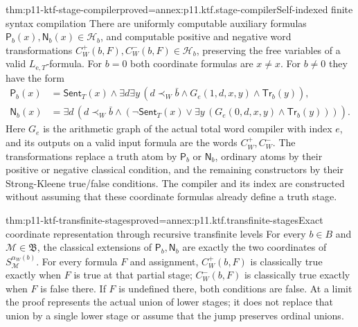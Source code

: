 \begin{hblemma}{thm:p11-ktf-stage-compiler}{proved=annex:p11.ktf.stage-compiler}{Self-indexed finite syntax compilation}
There are uniformly computable auxiliary formulas
\(\mathsf P_b(x),\mathsf N_b(x)\in\mathcal H_b\), and
computable positive and negative word transformations
\(C_W^+(b,F),C_W^-(b,F)\in\mathcal H_b\), preserving
the free variables of a valid \(L_{\mathrm e,T}\)-formula.
For \(b=0\) both coordinate formulas are \(x\ne x\).
For \(b\ne0\) they have the form
\[
\begin{split}
 \mathsf P_b(x)&=\mathsf{Sent}_T(x)\land
   \exists d\exists y\,
   (d\prec_W\bar b\land G_e(1,d,x,y)\land\mathsf{Tr}_b(y)),\\
 \mathsf N_b(x)&=\exists d\,
   (d\prec_W\bar b\land
      (\neg\mathsf{Sent}_T(x)\lor
        \exists y\,(G_e(0,d,x,y)\land\mathsf{Tr}_b(y)))).
\end{split}
\]
Here \(G_e\) is the arithmetic graph of the actual total
word compiler with index \(e\), and its outputs on a valid
input formula are the words \(C_W^+,C_W^-\).
The transformations replace a truth atom by \(\mathsf P_b\)
or \(\mathsf N_b\), ordinary atoms by their positive or
negative classical condition, and the remaining constructors by
their Strong-Kleene true/false conditions. The compiler and its
index are constructed without assuming that these coordinate
formulas already define a truth stage.
\end{hblemma}

\begin{hbtheorem}{thm:p11-ktf-transfinite-stages}{proved=annex:p11.ktf.transfinite-stages}{Exact coordinate representation through recursive transfinite levels}
For every \(b\in B\) and \(\mathcal M\in\mathfrak B\),
the classical extensions of \(\mathsf P_b,\mathsf N_b\)
are exactly the two coordinates of
\(S_{\mathcal M}^{\alpha_W(b)}\). For every formula \(F\)
and assignment, \(C_W^+(b,F)\) is classically true exactly
when \(F\) is true at that partial stage; \(C_W^-(b,F)\)
is classically true exactly when \(F\) is false there.
If \(F\) is undefined there, both conditions are false.
At a limit the proof represents the actual union of lower stages;
it does not replace that union by a single lower stage or assume
that the jump preserves ordinal unions.
\end{hbtheorem}

